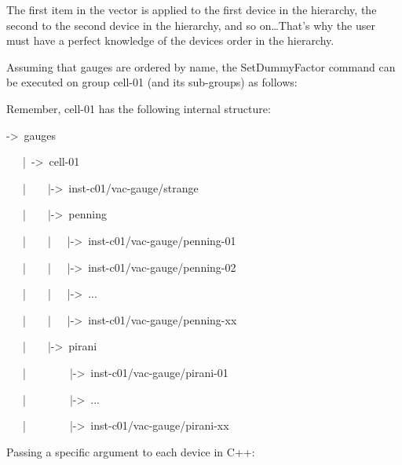 The first item in the vector is applied to the first device in the
hierarchy, the second to the second device in the hierarchy, and so
on\ldots{}That's why the user must have a \textquotedbl{}perfect\textquotedbl{}
knowledge of the devices order in the hierarchy. 

Assuming that gauges are ordered by name, the SetDummyFactor command
can be executed on group \textquotedbl{}cell-01\textquotedbl{} (and
its sub-groups) as follows:

Remember, \textquotedbl{}cell-01\textquotedbl{} has the following
internal structure: 
\begin{lyxcode}
->~gauges

~~~|~->~cell-01

~~~|~~~~|->~inst-c01/vac-gauge/strange

~~~|~~~~|->~penning

~~~|~~~~|~~~|->~inst-c01/vac-gauge/penning-01

~~~|~~~~|~~~|->~inst-c01/vac-gauge/penning-02

~~~|~~~~|~~~|->~...

~~~|~~~~|~~~|->~inst-c01/vac-gauge/penning-xx

~~~|~~~~|->~pirani

~~~|~~~~~~~~|->~inst-c01/vac-gauge/pirani-01

~~~|~~~~~~~~|->~...

~~~|~~~~~~~~|->~inst-c01/vac-gauge/pirani-xx
\end{lyxcode}
Passing a specific argument to each device in C++:

